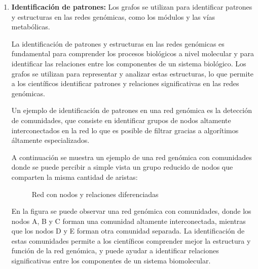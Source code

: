 \documentclass[11pt, a4paper]{article}
\begin{document}
\begin{enumerate}
    \begin{flushright}
      \textit{\cite{berenstein2014analisis}}
    \end{flushright}

    \item \textbf{Identificación de patrones:} Los grafos se utilizan para identificar patrones y estructuras en las redes genómicas, como los módulos y las vías metabólicas.
    
    La identificación de patrones y estructuras en las redes genómicas es fundamental para comprender los procesos biológicos a nivel molecular y para identificar las relaciones entre los componentes de un sistema biológico. Los grafos se utilizan para representar y analizar estas estructuras, lo que permite a los científicos identificar patrones y relaciones significativas en las redes genómicas.

    Un ejemplo de identificación de patrones en una red genómica es la detección de comunidades, que consiste en identificar grupos de nodos altamente interconectados en la red lo que es posible de filtrar gracias a algorítimos áltamente especializados.

    A continuación se muestra un ejemplo de una red genómica con comunidades donde se puede percibir a simple vista un grupo reducido de nodos que comparten la misma cantidad de aristas:

    \begin{figure}[H]
      \centering
      \caption{Red con nodos y relaciones diferenciadas}
      \label{fig:red-relaciones}
  \end{figure}
  
  En la figura se puede observar una red genómica con comunidades, donde los nodos A, B y C forman una comunidad altamente interconectada, mientras que los nodos D y E forman otra comunidad separada. La identificación de estas comunidades permite a los científicos comprender mejor la estructura y función de la red genómica, y puede ayudar a identificar relaciones significativas entre los componentes de un sistema biomolecular.



\end{enumerate}
\end{document}
